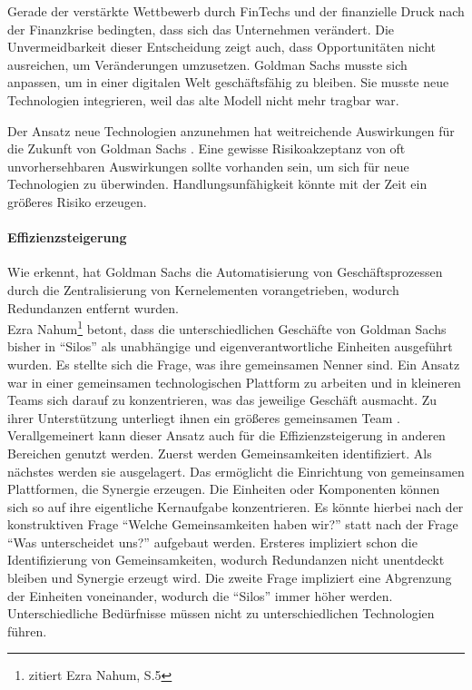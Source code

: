 Gerade der verstärkte Wettbewerb durch FinTechs und der finanzielle Druck nach der Finanzkrise bedingten, dass sich das Unternehmen verändert. Die Unvermeidbarkeit dieser Entscheidung zeigt auch, dass Opportunitäten nicht ausreichen, um Veränderungen umzusetzen. Goldman Sachs musste sich anpassen, um in einer digitalen Welt geschäftsfähig zu bleiben. Sie musste neue Technologien integrieren, weil das alte Modell nicht mehr tragbar war. 

Der Ansatz neue Technologien anzunehmen hat weitreichende Auswirkungen für die Zukunft von Goldman Sachs \cite{Gupta:2017}. Eine gewisse Risikoakzeptanz von oft unvorhersehbaren Auswirkungen sollte vorhanden sein, um sich für neue Technologien zu überwinden. Handlungsunfähigkeit könnte mit der Zeit ein größeres Risiko erzeugen. 

\paragraph{Effizienzsteigerung}
Wie \citet{Gupta:2017} erkennt, hat Goldman Sachs die Automatisierung von Geschäftsprozessen durch die Zentralisierung von Kernelementen vorangetrieben, wodurch Redundanzen entfernt wurden. 
\medskip
\\
Ezra Nahum\footnote{\citet{Gupta:2017} zitiert Ezra Nahum, S.5} betont, dass die unterschiedlichen Geschäfte von Goldman Sachs bisher in \enquote{Silos} als unabhängige und eigenverantwortliche Einheiten ausgeführt wurden. Es stellte sich die Frage, was ihre gemeinsamen Nenner sind. Ein Ansatz war in einer gemeinsamen technologischen Plattform zu arbeiten und in kleineren Teams sich darauf zu konzentrieren, was das jeweilige Geschäft ausmacht. Zu ihrer Unterstützung unterliegt ihnen ein größeres gemeinsamen Team \cite{Gupta:2017}.
\bigskip
\\
Verallgemeinert kann dieser Ansatz auch für die Effizienzsteigerung in anderen Bereichen genutzt werden. Zuerst werden Gemeinsamkeiten identifiziert. Als nächstes werden sie ausgelagert. Das ermöglicht die Einrichtung von gemeinsamen Plattformen, die Synergie erzeugen. Die Einheiten oder Komponenten können sich so auf ihre eigentliche Kernaufgabe konzentrieren. Es könnte hierbei nach der konstruktiven Frage \enquote{Welche Gemeinsamkeiten haben wir?} statt nach der Frage \enquote{Was unterscheidet uns?} aufgebaut werden. Ersteres impliziert schon die Identifizierung von Gemeinsamkeiten, wodurch Redundanzen nicht unentdeckt bleiben und Synergie erzeugt wird. Die zweite Frage impliziert eine Abgrenzung der Einheiten voneinander, wodurch die \enquote{Silos} immer höher werden. Unterschiedliche Bedürfnisse müssen nicht zu unterschiedlichen Technologien führen. 
